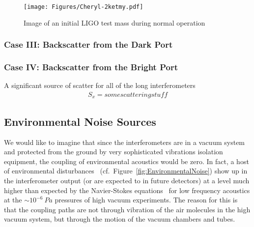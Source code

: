 \begin{figure}[h]
  \centering
    \texttt{[image: Figures/Cheryl-2ketmy.pdf]}
    \caption{Image of an initial LIGO test mass during normal operation}
    \label{fig:2kETMy}
\end{figure}

\subsubsection{Case III: Backscatter from the Dark Port}


\subsubsection{Case IV: Backscatter from the Bright Port}



A significant source of scatter for all of the long interferometers
\begin{align}
S_x = some scattering stuff
\end{align}

\subsection{Environmental Noise Sources}
\label{s:IDC:PEM}
We would like to imagine that since the interferometers are in a vacuum system and
protected from the ground by very sophisticated vibrations isolation equipment,
the coupling of environmental acoustics would be zero. In fact, a host of environmental
disturbances~\cite{Effler:2015hw, Acernese:2006dq} (cf.~Figure~\ref{fig:EnvironmentalNoise})
show up in the interferometer output (or are expected to in future detectors)
at a level much higher than expected by the Navier-Stokes
equations~\cite{Greenspan:sound} for low frequency acoustics at the $\sim10^{-6}~Pa$
pressures of high vacuum experiments. The reason for this is that the coupling
paths are not through vibration of the air molecules in the high vacuum system,
but through the motion of the vacuum chambers and tubes.




